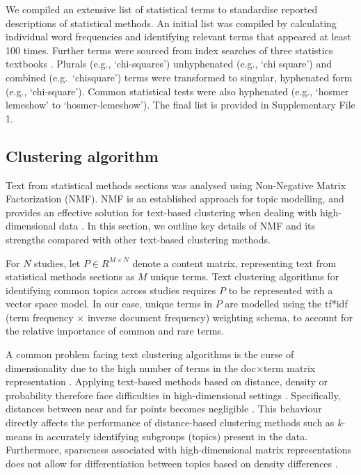 \documentclass[12pt]{article}
\begin{document}
We compiled an extensive list of statistical terms to standardise
reported descriptions of statistical methods. An initial list was
compiled by calculating individual word frequencies and identifying
relevant terms that appeared at least 100 times. Further terms were
sourced from index searches of three statistics textbooks
\citep[\citet{Diggle2013},\citet{Bland2015}]{Dobson2018}. Plurals (e.g.,
`chi-squares') unhyphenated (e.g., `chi square') and combined
(e.g.~`chisquare') terms were transformed to singular, hyphenated form
(e.g., `chi-square'). Common statistical tests were also hyphenated
(e.g., `hosmer lemeshow' to `hosmer-lemeshow'). The final list is
provided in Supplementary File 1.

\subsection{Clustering algorithm}

Text from statistical methods sections was analysed using Non-Negative
Matrix Factorization (NMF). NMF is an established approach for topic
modelling, and provides an effective solution for text-based clustering
when dealing with high-dimensional data
\citep[\citet{luong2019clustering}]{kim2014algorithms}. In this section,
we outline key details of NMF and its strengths compared with other
text-based clustering methods.

For \(N\) studies, let \(P \in R^{M \times N}\) denote a content matrix,
representing text from statistical methods sections as \(M\) unique
terms. Text clustering algorithms for identifying common topics across
studies requires \(P\) to be represented with a vector space model. In
our case, unique terms in \(P\) are modelled using the tf*idf (term
frequency \(\times\) inverse document frequency) weighting schema, to
account for the relative importance of common and rare terms.

A common problem facing text clustering algorithms is the curse of
dimensionality due to the high number of terms in the doc\(\times\)term
matrix representation
\citep[\citet{sutanto2018fine}]{aggarwal2012mining}. Applying text-based
methods based on distance, density or probability therefore face
difficulties in high-dimensional settings
\citep[\citet{mohotti2018corpus},\citet{mohotti2019concept}]{park2018examining}.
Specifically, distances between near and far points becomes negligible
\citep{aggarwal2012mining}. This behaviour directly affects the
performance of distance-based clustering methods such as
\textit{k}-means \citep{jain} in accurately identifying subgroups
(topics) present in the data. Furthermore, sparseness associated with
high-dimensional matrix representations does not allow for
differentiation between topics based on density differences
\citep[\citet{mohotti2018efficient}]{mohotti2018corpus}.
\end{document}
